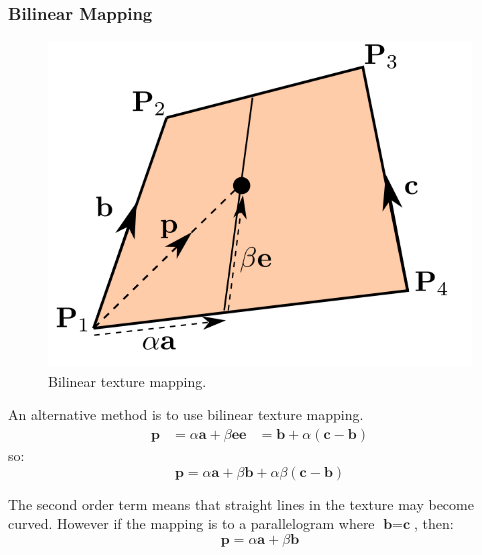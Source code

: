 \documentclass[11pt]{article}
\begin{document}
\subsubsection{Bilinear Mapping}
\begin{figure}[htb!]
  \centering
  \caption{Bilinear texture mapping.}
  \includegraphics[scale=0.3]{bilinearmap}
\end{figure}
An alternative method is to use bilinear texture mapping.
\begin{align*}
  \textbf{p} &= \alpha\textbf{a} + \beta\textbf{e}
  \textbf{e} &= \textbf{b} + \alpha(\textbf{c} - \textbf{b})
\end{align*}
so:
\[
  \textbf{p} = \alpha\textbf{a} + \beta\textbf{b} + \alpha\beta(\textbf{c} - \textbf{b})
\]

The second order term means that straight lines in the texture may become curved.
However if the mapping is to a parallelogram where $\textbf{b} = \textbf{c}$, then:
\[
  \textbf{p} = \alpha\textbf{a} + \beta\textbf{b}
\]
\end{document}
